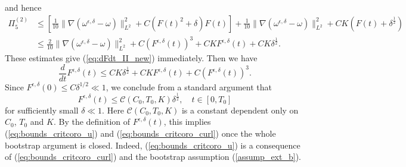 \documentclass[reqno,10pt]{amsart}
\theoremstyle{definition}
\theoremstyle{remark}
\numberwithin{equation}{section}
\begin{document}
and hence
\[
\begin{aligned}
    \Pi_{5}^{(2)} &\le \left[ \frac{1}{10} \|\nabla(\omega^{\epsilon,\delta}-\omega)\|_{L^2}^2 + C(F(t)^2+\delta)F(t) \right] + \frac{1}{10} \|\nabla(\omega^{\epsilon,\delta}-\omega)\|_{L^2}^2 + CK(F(t)+\delta^{\frac{1}{2}}) \\
    &\le \frac{2}{10} \|\nabla(\omega^{\epsilon,\delta}-\omega)\|_{L^2}^2 + C\left(F^{\epsilon,\delta}(t)\right)^3 + CKF^{\epsilon,\delta}(t) + CK\delta^{\frac{1}{2}}.
\end{aligned}
\]
These estimates give (\ref{eq:dFdt_II_new}) immediately. Then we have
\[
    \frac{d}{dt}F^{\epsilon,\delta}(t) \le CK\delta^{\frac{1}{2}} + CKF^{\epsilon,\delta}(t) + C\left(F^{\epsilon,\delta}(t)\right)^3.
\]
Since $F^{\epsilon,\delta}(0)\le C\delta^{1/2}\ll 1$, we conclude from a standard argument that
\begin{equation} \label{eq:}
    F^{\epsilon,\delta}(t)\le \mathcal C(C_0, T_0,K)\delta^{\frac{1}{2}}, \quad t\in[0,T_0]
\end{equation}
for sufficiently small $\delta \ll 1$. Here $\mathcal C(C_0,T_0,K)$ is a constant dependent only on $C_0$, $T_0$ and $K$. By the definition of $F^{\epsilon,\delta}(t)$, this implies (\ref{eq:bounds_critcoro_u}) and (\ref{eq:bounds_critcoro_curl}) once the whole bootstrap argument is closed. Indeed, (\ref{eq:bounds_critcoro_u}) is a consequence of (\ref{eq:bounds_critcoro_curl}) and the bootstrap assumption (\ref{assump_ext_b}).
\end{document}
